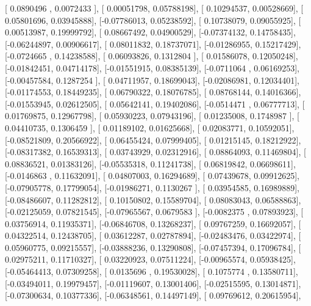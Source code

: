 \documentclass{article}
\begin{document}
       [ 0.0890496 ,  0.0072433 ],
       [ 0.00051798,  0.05788198],
       [ 0.10294537,  0.00528669],
       [ 0.05801696,  0.03945888],
       [-0.07786013,  0.05238592],
       [ 0.10738079,  0.09055925],
       [ 0.00513987,  0.19999792],
       [ 0.08667492,  0.04900529],
       [-0.07374132,  0.14758435],
       [-0.06244897,  0.00906617],
       [ 0.08011832,  0.18737071],
       [-0.01286955,  0.15217429],
       [-0.0724665 ,  0.14238588],
       [ 0.06093826,  0.1312804 ],
       [ 0.01586078,  0.12050248],
       [-0.01842451,  0.04714178],
       [-0.01551915,  0.08385139],
       [-0.0711064 ,  0.06169253],
       [-0.00457584,  0.1287254 ],
       [ 0.04711957,  0.18699043],
       [-0.02086981,  0.12034401],
       [-0.01174553,  0.18449235],
       [ 0.06790322,  0.18076785],
       [ 0.08768144,  0.14016366],
       [-0.01553945,  0.02612505],
       [ 0.05642141,  0.19402086],
       [-0.0514471 ,  0.06777713],
       [ 0.01769875,  0.12967798],
       [ 0.05930223,  0.07943196],
       [ 0.01235008,  0.1748987 ],
       [ 0.04410735,  0.1306459 ],
       [ 0.01189102,  0.01625668],
       [ 0.02083771,  0.10592051],
       [-0.08521809,  0.20566922],
       [ 0.06455424,  0.07999405],
       [ 0.01215145,  0.18212922],
       [-0.08317382,  0.16539313],
       [ 0.03743929,  0.02312916],
       [ 0.08864093,  0.11469804],
       [ 0.08836521,  0.01383126],
       [-0.05535318,  0.11241738],
       [ 0.06819842,  0.06698611],
       [-0.0146863 ,  0.11632091],
       [ 0.04807003,  0.16294689],
       [ 0.07439678,  0.09912625],
       [-0.07905778,  0.17799054],
       [-0.01986271,  0.1130267 ],
       [ 0.03954585,  0.16989889],
       [-0.08486607,  0.11282812],
       [ 0.10150802,  0.15589704],
       [ 0.08083043,  0.06588863],
       [-0.02125059,  0.07821545],
       [-0.07965567,  0.0679583 ],
       [-0.0082375 ,  0.07893923],
       [ 0.03756914,  0.11935371],
       [-0.06846708,  0.13268237],
       [ 0.09767259,  0.16692057],
       [ 0.04322514,  0.12438705],
       [ 0.03612287,  0.02787894],
       [-0.02483476,  0.03422974],
       [ 0.05960775,  0.09215557],
       [-0.03888236,  0.13290808],
       [-0.07457394,  0.17096784],
       [ 0.02975211,  0.11710327],
       [ 0.03220923,  0.07511224],
       [-0.00965574,  0.05938425],
       [-0.05464413,  0.07309258],
       [ 0.0135696 ,  0.19530028],
       [ 0.1075774 ,  0.13580711],
       [-0.03494011,  0.19979457],
       [-0.01119607,  0.13001406],
       [-0.02515595,  0.13014871],
       [-0.07300634,  0.10377336],
       [-0.06348561,  0.14497149],
       [ 0.09769612,  0.20615954],
\end{document}
